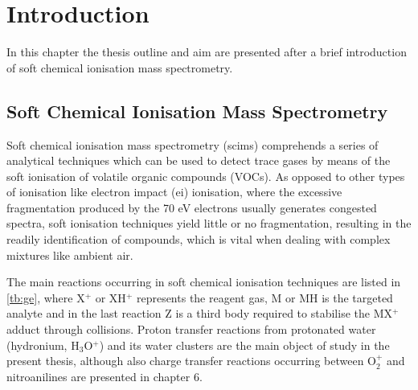 \chapter{Introduction}
In this chapter the thesis outline and aim are presented after a brief introduction of soft chemical ionisation mass spectrometry.







\section{Soft Chemical Ionisation Mass Spectrometry}
Soft chemical ionisation mass spectrometry (\acrshort{scims}) comprehends a series of analytical techniques which can be used to detect trace gases by means of the soft ionisation of volatile organic compounds (\acrshort{VOC}s). As opposed to other types of ionisation like electron impact (\acrshort{ei}) ionisation, where the excessive fragmentation produced by the 70 eV electrons usually generates congested spectra, soft ionisation techniques yield little or no fragmentation, resulting in the readily identification of compounds, which is vital when dealing with complex mixtures like ambient air.









The main reactions occurring in soft chemical ionisation techniques are listed in \autoref{tb:ge}, where X$^+$ or XH$^+$ represents the reagent gas, M or MH is the targeted analyte and in the last reaction Z is a third body required to stabilise the MX$^+$ adduct through collisions.
%
Proton transfer reactions from protonated water (hydronium, H$_3$O$^+$) and its water clusters are the main object of study in the present thesis, although also charge transfer reactions occurring between O$_2^+$ and nitroanilines are  presented in chapter 6.


